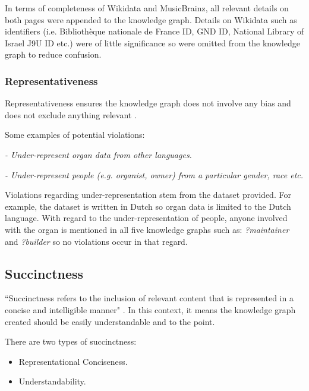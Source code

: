 In terms of completeness of Wikidata and MusicBrainz, all relevant details on both pages were appended to the knowledge graph. Details on Wikidata such as identifiers (i.e. Bibliothèque nationale de France ID, GND ID, National Library of Israel J9U ID etc.) were of little significance so were omitted from the knowledge graph to reduce confusion.

\subsubsection{Representativeness}
\hspace{0.5cm} Representativeness ensures the knowledge graph does not involve any bias and does not exclude anything relevant \cite{knowledgegraphevaulationbook}.

\noindent Some examples of potential violations: 

\vspace{-0.1cm}
\begin{displayquote}
    \textit{- Under-represent organ data from other languages.}
\end{displayquote}  
\vspace{-0.675cm}
\begin{displayquote}
     \textit{- Under-represent people (e.g. organist, owner) from a particular gender, race etc. }  
\end{displayquote}
\vspace{-0.1cm}

Violations regarding under-representation stem from the dataset provided. For example, the dataset is written in Dutch so organ data is limited to the Dutch language. With regard to the under-representation of people, anyone involved with the organ is mentioned in all five knowledge graphs such as: \textit{?maintainer} and \textit{?builder} so no violations occur in that regard.

\subsection{Succinctness}
\hspace{0.5cm} ``Succinctness refers to the inclusion of relevant content that is represented in a concise and intelligible manner" \cite{knowledgegraphevaulationbook}. In this context, it means the knowledge graph created should be easily understandable and to the point. 

\noindent There are two types of succinctness: 

\vspace{-0.15cm}
\begin{itemize}
    \itemsep0em 
\item Representational Conciseness.
\vspace{-0.1cm}
\item Understandability.
\end{itemize}
\vspace{-0.4cm}

